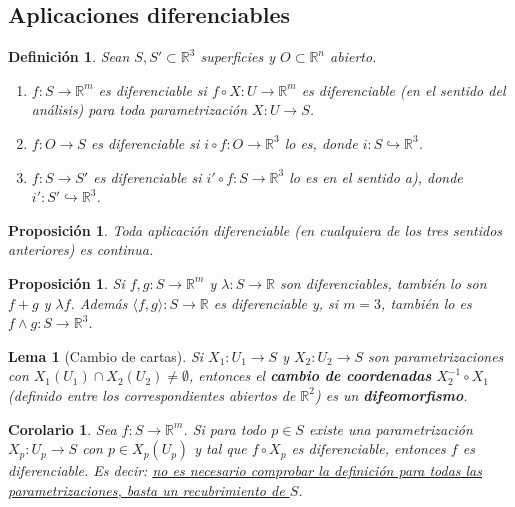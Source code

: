 \documentclass[11pt]{article}
\theoremstyle{plain}
\newtheorem{definicion}[teorema]{Definición}
\newtheorem{proposicion}[teorema]{Proposición}
\newtheorem{corolario}[teorema]{Corolario}
\newtheorem{lema}[teorema]{Lema}
\theoremstyle{definition}
\theoremstyle{remark}
\begin{document}
\subsection{Aplicaciones diferenciables}

\begin{definicion}
Sean $S,S'\subset\mathbb{R}^3$ superficies y $O\subset\mathbb{R}^n$ abierto.
\begin{enumerate}[label=\alph*)]
\item $f:S\to\mathbb{R}^m$ es diferenciable si $f\circ X:U\to\mathbb{R}^m$ es diferenciable (en el sentido del análisis) para \emph{toda} parametrización $X:U\to S$.
\item $f:O\to S$ es diferenciable si $i\circ f:O\to\mathbb{R}^3$ lo es, donde $i:S\hookrightarrow\mathbb{R}^3$.
\item $f:S\to S'$ es diferenciable si $i'\circ f:S\to\mathbb{R}^3$ lo es en el sentido a), donde $i':S'\hookrightarrow\mathbb{R}^3$.
\end{enumerate}
\end{definicion}

\begin{proposicion}
Toda aplicación diferenciable (en cualquiera de los tres sentidos anteriores) es continua.
\end{proposicion}

\begin{proposicion}
Si $f,g:S\to\mathbb{R}^m$ y $\lambda:S\to\mathbb{R}$ son diferenciables, también lo son $f+g$ y $\lambda f$. Además $\langle f,g\rangle:S\to\mathbb{R}$ es diferenciable y, si $m=3$, también lo es $f\land g:S\to\mathbb{R}^3$.
\end{proposicion}

\begin{lema}[Cambio de cartas]\label{lema:cambio_cartas}
Si $X_1:U_1\to S$ y $X_2:U_2\to S$ son parametrizaciones con $X_1(U_1)\cap X_2(U_2)\neq\emptyset$, entonces el \textbf{cambio de coordenadas} $X_2^{-1}\circ X_1$ (definido entre los correspondientes abiertos de $\mathbb{R}^2$) es un \textbf{difeomorfismo}.
\end{lema}

\begin{corolario}\label{coro:recubrimiento}
Sea $f:S\to\mathbb{R}^m$. Si para todo $p\in S$ existe una parametrización $X_p:U_p\to S$ con $p\in X_p(U_p)$ y tal que $f\circ X_p$ es diferenciable, entonces $f$ es diferenciable. Es decir: \underline{no es necesario comprobar la definición para todas las parametrizaciones, basta un recubrimiento de $S$}.
\end{corolario}
\end{document}
